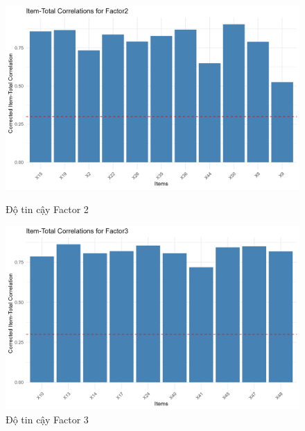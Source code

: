 \begin{figure}[h!]
    \centering
    \begin{minipage}{0.48\textwidth}
        \centering
        \includegraphics[width=\linewidth]{../../assets/images/reliability_Factor2.png}
        \caption{Độ tin cậy Factor 2}
        \label{fig:h3}
    \end{minipage}
    \hfill
    \begin{minipage}{0.48\textwidth}
        \centering
        \includegraphics[width=\linewidth]{../../assets/images/reliability_Factor3.png}
        \caption{Độ tin cậy Factor 3}
        \label{fig:h4}
    \end{minipage}
\end{figure}

